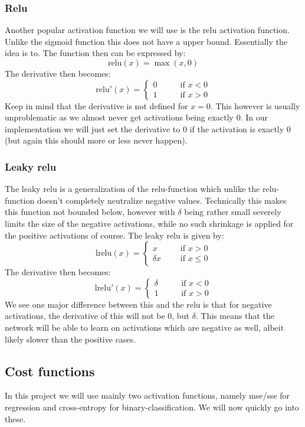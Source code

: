 \documentclass{article}
\begin{document}
\subsubsection{Relu}
\label{relu-desc}
Another popular activation function we will use is the relu activation function.
Unlike the sigmoid function this does not have a upper bound. Essentially the
idea is to. The function then can be expressed by:
$$\text{relu}(x) = \max(x, 0)$$
The derivative then becomes:
$$\text{relu}'(x) = \begin{cases}
            0 \qquad & \text{if } x < 0 \\
            1        & \text{if } x > 0
      \end{cases}$$
Keep in mind that the derivative is not defined for $x=0$. This however is
usually unproblematic as we almost never get activations being exactly $0$. In
our implementation we will just set the derivative to $0$ if the activation is
exactly $0$ (but again this should more or less never happen).

\subsubsection{Leaky relu}
The leaky relu is a generalization of the relu-function which unlike the
relu-function doesn't completely neutralize negative values.  Technically this
makes this function not bounded below, however with $\delta$ being rather small
severely limits the size of the negative activations, while no such shrinkage is
applied for the positive activations of course. The leaky relu is given by:
$$\text{lrelu}(x) = \begin{cases}
            x \qquad & \text{if } x > 0    \\
            \delta x & \text{if } x \leq 0
      \end{cases}$$
The derivative then becomes:
$$\text{lrelu}'(x) = \begin{cases}
            \delta \qquad & \text{if } x < 0 \\
            1             & \text{if } x > 0
      \end{cases}$$
We see one major difference between this and the relu is that for negative
activations, the derivative of this will not be $0$, but $\delta$. This means
that the network will be able to learn on activations which are negative as
well, albeit likely slower than the positive cases.

\subsection{Cost functions}
In this project we will use mainly two activation functions, namely mse/sse for
regression and cross-entropy for binary-classification. We will now quickly go
into these.
\end{document}
